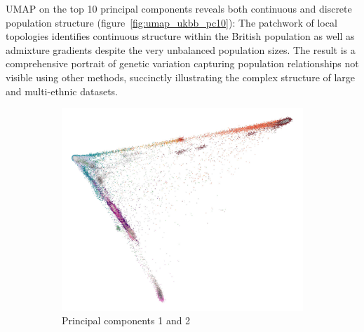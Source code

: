 \documentclass[12pt]{pnas-new}
\begin{document}
UMAP on the top 10 principal components reveals both continuous and discrete population structure (figure~\ref{fig:umap_ukbb_pc10}): The patchwork of local topologies identifies continuous structure within the British population as well as admixture gradients despite the very unbalanced population sizes. The result is a comprehensive portrait of genetic variation capturing population relationships not visible using other methods, succinctly illustrating the complex structure of large and multi-ethnic datasets.

\begin{figure}%
\centering
\begin{subfigure}{.5\columnwidth}
\includegraphics[width=\columnwidth]{images/UKBB_PC0_PC1_eth_crop.pdf}%
\caption{Principal components 1 and 2}%
\label{fig:pc_ukbb}%
\end{subfigure}\hfill%
\begin{subfigure}{.5\columnwidth}

\end{subfigure}
\end{figure}
\end{document}
